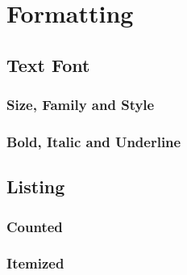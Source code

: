 \chapter{Formatting}
\section{Text Font}
\subsection{Size, Family and Style}
\subsection{Bold, Italic and Underline}

\section{Listing}
\subsection{Counted}
\subsection{Itemized}
